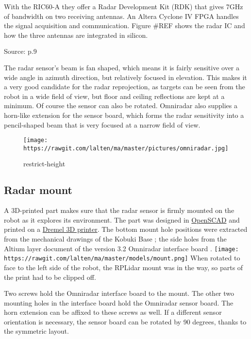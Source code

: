 With the RIC60-A they offer a Radar Development Kit (RDK) that gives
7GHz of bandwidth on two receiving antennas. An Altera Cyclone IV FPGA
handles the signal acquisition and communication. Figure \#REF shows the
radar IC and how the three antennas are integrated in silicon.

%
Source: \cite{Brouwer2015} p.9

The radar sensor's beam is fan shaped, which means it is fairly
sensitive over a wide angle in azimuth direction, but relatively focused
in elevation. This makes it a very good candidate for the radar
reprojection, as targets can be seen from the robot in a wide field of
view, but floor and ceiling reflections are kept at a minimum. Of course
the sensor can also be rotated. Omniradar also supplies a horn-like
extension for the sensor board, which forms the radar sensitivity into a
pencil-shaped beam that is very focused at a narrow field of view.

\begin{figure}
\centering
\texttt{[image: https://rawgit.com/lalten/ma/master/pictures/omniradar.jpg]}
\caption{restrict-height}
\end{figure}

\subsection{Radar mount}\label{radar-mount}

A 3D-printed part makes sure that the radar sensor is firmly mounted on
the robot as it explores its environment. The part was designed in
\href{http://www.openscad.org/}{OpenSCAD} and printed on a
\href{https://3dprinter.dremel.com/}{Dremel 3D printer}. The bottom
mount hole positions were extracted from the mechanical drawings of the
Kobuki Base \cite{YujinRobot2012}; the side holes from the Altium layer
document of the version 3.2 Omniradar interface board
\cite{Omniradar2014}.
\texttt{[image: https://rawgit.com/lalten/ma/master/models/mount.png]}
When rotated to face to the left side of the robot, the RPLidar mount
was in the way, so parts of the print had to be clipped off.

Two screws hold the Omniradar interface board to the mount. The other
two mounting holes in the interface board hold the Omniradar sensor
board. The horn extension can be affixed to these screws as well. If a
different sensor orientation is necessary, the sensor board can be
rotated by 90 degrees, thanks to the symmetric layout.

